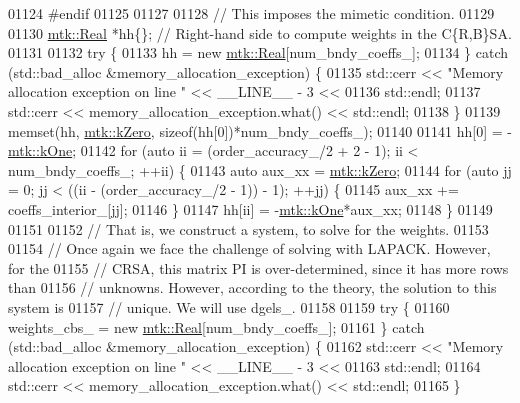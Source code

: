\begin{DoxyCode}
{{01124 \textcolor{preprocessor}{  #endif}
01125 
01127 
01128   \textcolor{comment}{// This imposes the mimetic condition.}
01129 
01130   \hyperlink{group__c01-roots_gac080bbbf5cbb5502c9f00405f894857d}{mtk::Real} *hh\{\};  \textcolor{comment}{// Right-hand side to compute weights in the C\{R,B\}SA.}
01131 
01132   \textcolor{keywordflow}{try} \{
01133     hh = \textcolor{keyword}{new} \hyperlink{group__c01-roots_gac080bbbf5cbb5502c9f00405f894857d}{mtk::Real}[num\_bndy\_coeffs\_];
01134   \} \textcolor{keywordflow}{catch} (std::bad\_alloc &memory\_allocation\_exception) \{
01135     std::cerr << \textcolor{stringliteral}{"Memory allocation exception on line "} << \_\_LINE\_\_ - 3 <<
01136       std::endl;
01137     std::cerr << memory\_allocation\_exception.what() << std::endl;
01138   \}
01139   memset(hh, \hyperlink{group__c01-roots_ga59a451a5fae30d59649bcda274fea271}{mtk::kZero}, \textcolor{keyword}{sizeof}(hh[0])*num\_bndy\_coeffs\_);
01140 
01141   hh[0] = -\hyperlink{group__c01-roots_ga26407c24d43b6b95480943340d285c71}{mtk::kOne};
01142   \textcolor{keywordflow}{for} (\textcolor{keyword}{auto} ii = (order\_accuracy\_/2 + 2 - 1); ii < num\_bndy\_coeffs\_; ++ii) \{
01143     \textcolor{keyword}{auto} aux\_xx = \hyperlink{group__c01-roots_ga59a451a5fae30d59649bcda274fea271}{mtk::kZero};
01144     \textcolor{keywordflow}{for} (\textcolor{keyword}{auto} jj = 0; jj < ((ii - (order\_accuracy\_/2 - 1)) - 1); ++jj) \{
01145       aux\_xx += coeffs\_interior\_[jj];
01146     \}
01147     hh[ii] = -\hyperlink{group__c01-roots_ga26407c24d43b6b95480943340d285c71}{mtk::kOne}*aux\_xx;
01148   \}
01149 
01151 
01152   \textcolor{comment}{// That is, we construct a system, to solve for the weights.}
01153 
01154   \textcolor{comment}{// Once again we face the challenge of solving with LAPACK. However, for the}
01155   \textcolor{comment}{// CRSA, this matrix PI is over-determined, since it has more rows than}
01156   \textcolor{comment}{// unknowns. However, according to the theory, the solution to this system is}
01157   \textcolor{comment}{// unique. We will use dgels\_.}
01158 
01159   \textcolor{keywordflow}{try} \{
01160     weights\_cbs\_ = \textcolor{keyword}{new} \hyperlink{group__c01-roots_gac080bbbf5cbb5502c9f00405f894857d}{mtk::Real}[num\_bndy\_coeffs\_];
01161   \} \textcolor{keywordflow}{catch} (std::bad\_alloc &memory\_allocation\_exception) \{
01162     std::cerr << \textcolor{stringliteral}{"Memory allocation exception on line "} << \_\_LINE\_\_ - 3 <<
01163       std::endl;
01164     std::cerr << memory\_allocation\_exception.what() << std::endl;
01165   \}
}}
\end{DoxyCode}
